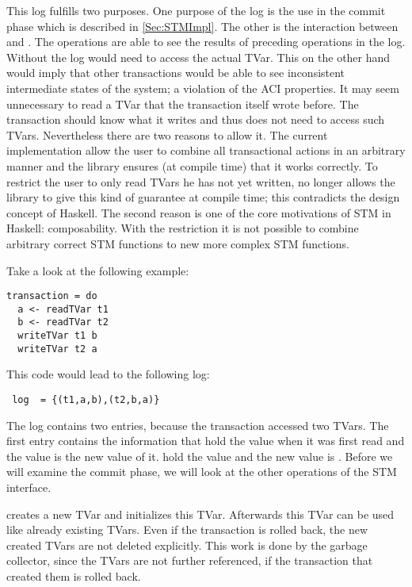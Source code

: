 This log fulfills two purposes. One purpose of the log is the use in the commit phase which is described in \ref{Sec:STMImpl}.
The other is the interaction between  and . The  operations are able to see the results 
of preceding  operations in the log. Without the log  would need to access the actual TVar. This on the 
other hand would imply that other transactions would be able to see inconsistent intermediate states of the system;
a violation of the ACI properties. It may seem unnecessary to read a TVar that the transaction itself wrote before.
The transaction should know what it writes and thus does not need to access such TVars. Nevertheless there are two reasons 
to allow it. The current implementation allow the user to combine all transactional actions in an arbitrary manner and 
the library ensures (at compile time) that it works correctly. To restrict the user to only read TVars he has
not yet written, no longer allows the library to give this kind of guarantee at compile time; this contradicts
the design concept of Haskell. The second reason is one of the core motivations of STM in Haskell: composability.
With the restriction it is not possible to combine arbitrary correct STM functions to new more complex STM
functions. 

Take a look at the following example:
\begin{lstlisting}
transaction = do
  a <- readTVar t1
  b <- readTVar t2
  writeTVar t1 b
  writeTVar t2 a
\end{lstlisting}
This code would lead to the following log:
\begin{lstlisting}
 log  = {(t1,a,b),(t2,b,a)}
\end{lstlisting}
The log contains two entries, because the transaction accessed two TVars. The first entry contains the information that 
hold the value  when it was first read and the value  is the new value of it.  hold the value  
and the new value is . Before we will examine the commit phase, we will look at the other operations of the STM interface.

 creates a new TVar and initializes this TVar. Afterwards this TVar can be used like already existing TVars.
Even if the transaction is rolled back, the new created TVars are not deleted explicitly. This work is done by the garbage
collector, since the TVars are not further referenced, if the transaction that created them is rolled back. 

